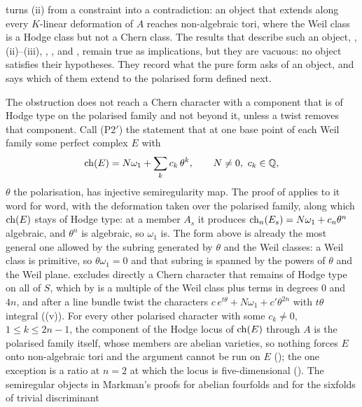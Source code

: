 \begin{remark}\label{rem:p2prime}
 turns (ii) from a constraint into a
contradiction: an object that extends along every $K$-linear deformation of
$A$ reaches non-algebraic tori, where the Weil class is a Hodge class but not
a Chern class. The results that describe such an object,
, (ii)--(iii), ,
, \cite[Theorem~2.32]{paperIII} and , remain true as
implications, but they are vacuous: no object satisfies their hypotheses.
They record what the pure form asks of an object, and
 says which of them extend to the polarised form
defined next.

The obstruction does not reach a Chern character with a component that is of
Hodge type on the polarised family and not beyond it, unless a twist removes
that component. Call
\textup{(P2$'$)} the statement that at one base point of each Weil family
some perfect complex $E$ with
\[
  \operatorname{ch}(E)=N\omega_{1}+\sum_{k}c_{k}\,\theta^{k},\qquad N\ne0,\ c_{k}\in\mathbb{Q},
\]
$\theta$ the polarisation, has injective semiregularity map. The proof of
 applies to it word for word, with the deformation
taken over the polarised family, along which $\operatorname{ch}(E)$ stays of Hodge type:
at a member $A_{s}$ it produces $\operatorname{ch}_{n}(E_{s})=N\omega_{1}+c_{n}\theta^{n}$
algebraic, and $\theta^{n}$ is algebraic, so $\omega_{1}$ is. The form above
is already the most general one allowed by the subring generated by $\theta$
and the Weil classes: a Weil class is primitive, so $\theta\omega_{1}=0$ and
that subring is spanned by the powers of $\theta$ and the Weil plane.
 excludes directly a Chern character that remains of Hodge
type on all of $S$, which by  is a multiple of the
Weil class plus terms in degrees $0$ and $4n$, and after a line bundle twist
the characters $c\,e^{t\theta}+N\omega_{1}+c'\theta^{2n}$ with $t\theta$
integral ((v)). For every other polarised character
with some $c_{k}\ne0$, $1\le k\le2n-1$, the component of the Hodge locus of
$\operatorname{ch}(E)$ through $A$ is the polarised family itself, whose members are
abelian varieties, so nothing forces $E$ onto non-algebraic tori and the
argument cannot be run on $E$ (); the one exception is
a ratio at $n=2$ at which the locus is five-dimensional
(). The semiregular objects in Markman's
proofs for abelian fourfolds and for the sixfolds of trivial discriminant

\end{remark}
